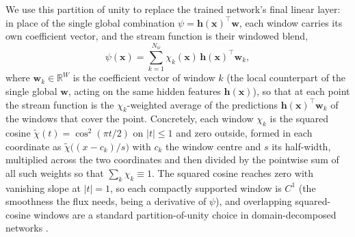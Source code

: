 \documentclass[a4paper,fleqn]{cas-sc}
\begin{document}
\begin{center}
\centering
{}
\label{fig:pou_windows}
\end{center}

We use this partition of unity to replace the trained network's final linear
layer: in place of the single global combination
\(\psi=\mathbf{h}(\mathbf{x})^{\!\top}\mathbf{w}\), each window carries its own
coefficient vector, and the stream function is their windowed blend,
\begin{equation}
  \psi(\mathbf{x})
  =
  \sum_{k=1}^{N_w}
  \chi_k(\mathbf{x})\,
  \mathbf{h}(\mathbf{x})^{\!\top}\mathbf{w}_k ,
  \label{eq:pou_head}
\end{equation}
where \(\mathbf{w}_k\in\mathbb{R}^{W}\) is the coefficient vector of window
\(k\) (the local counterpart of the single global \(\mathbf{w}\), acting on the
same hidden features \(\mathbf{h}(\mathbf{x})\)), so that at each point the
stream function is the \(\chi_k\)-weighted average of the predictions
\(\mathbf{h}(\mathbf{x})^{\!\top}\mathbf{w}_k\) of the windows that cover the
point. Concretely, each window \(\chi_k\) is the squared cosine
\(\widetilde\chi(t)=\cos^2(\pi t/2)\) on \(|t|\le1\) and zero outside, formed in
each coordinate as \(\widetilde\chi\bigl((x-c_k)/s\bigr)\) with \(c_k\) the
window centre and \(s\) its half-width, multiplied across the two coordinates
and then divided by the pointwise sum of all such weights so that
\(\sum_k\chi_k\equiv1\). The squared cosine reaches zero with vanishing slope at
\(|t|=1\), so each compactly supported window is \(C^1\) (the smoothness the
flux needs, being a derivative of \(\psi\)), and overlapping squared-cosine
windows are a standard partition-of-unity choice in domain-decomposed networks
\citep{Moseley2023}.
\end{document}
